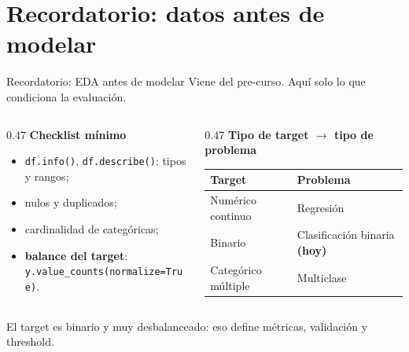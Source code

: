 \documentclass[aspectratio=169,12pt]{beamer}
\newcommand{\colhead}[1]{\textbf{#1}\par\vspace{2pt}}
\newcommand{\hrow}{\rowcolor{mlcream}}
\begin{document}
\section{Recordatorio: datos antes de modelar}

\begin{frame}{Recordatorio: EDA antes de modelar}
  {\color{mlgray}\footnotesize Viene del pre-curso. Aquí solo lo que condiciona la evaluación.}
  \begin{columns}[T]
    \begin{column}{0.47\textwidth}
      \colhead{Checklist mínimo}
      \begin{itemize}
        \item \texttt{df.info()}, \texttt{df.describe()}: tipos y rangos;
        \item nulos y duplicados;
        \item cardinalidad de categóricas;
        \item \textbf{balance del target}:\\ \texttt{y.value\_counts(normalize=True)}.
      \end{itemize}
    \end{column}
    \begin{column}{0.47\textwidth}
      \colhead{Tipo de target $\rightarrow$ tipo de problema}
      \footnotesize
      \begin{tabularx}{\linewidth}{@{}l >{\raggedright\arraybackslash}X@{}}
        \toprule
        \hrow Target & Problema \\
        \midrule
        Numérico continuo & Regresión \\
        Binario & Clasificación binaria \textbf{(hoy)} \\
        Categórico múltiple & Multiclase \\
        \bottomrule
      \end{tabularx}
    \end{column}
  \end{columns}
  \vspace{6pt}
  \begin{keybox}
    El target es binario y muy desbalanceado: eso define métricas, validación y threshold.
  \end{keybox}
\end{frame}
\end{document}
